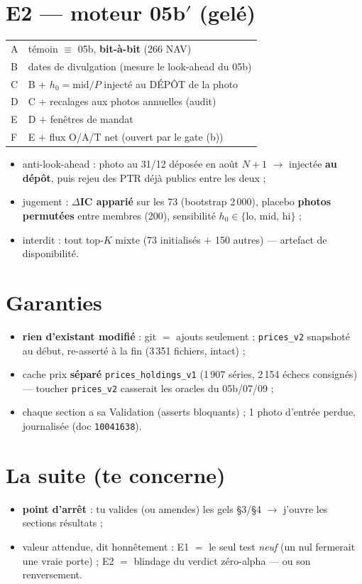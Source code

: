 \documentclass[10pt,a4paper,twocolumn]{article}
\begin{document}
\section{E2 --- moteur 05b$'$ (gelé)}
\begin{center}\small
\begin{tabularx}{\linewidth}{@{}lX@{}}
\toprule
A & témoin $\equiv$ 05b, \textbf{bit-à-bit} (266 NAV) \\
B & dates de divulgation (mesure le look-ahead du 05b) \\
C & B $+$ $h_0 = \text{mid}/P$ injecté au DÉPÔT de la photo \\
D & C $+$ recalages aux photos annuelles (audit) \\
E & D $+$ fenêtres de mandat \\
F & E $+$ flux O/A/T net (ouvert par le gate (b)) \\
\bottomrule
\end{tabularx}
\end{center}
\begin{itemize}
\item anti-look-ahead : photo \og{}au 31/12\fg{} déposée en août $N{+}1$ $\to$ injectée \textbf{au dépôt}, puis rejeu des PTR déjà publics entre les deux ;
\item jugement : \textbf{$\Delta$IC apparié} sur les 73 (bootstrap 2\,000), placebo \textbf{photos permutées} entre membres (200), sensibilité $h_0 \in \{$lo, mid, hi$\}$ ;
\item interdit : tout top-$K$ mixte (73 initialisés $+$ 150 autres) --- artefact de disponibilité.
\end{itemize}

\section{Garanties}
\begin{itemize}
\item \textbf{rien d'existant modifié} : git $=$ ajouts seulement ; \texttt{prices\_v2} snapshoté au début, re-asserté à la fin (3\,351 fichiers, intact) ;
\item cache prix \textbf{séparé} \texttt{prices\_holdings\_v1} (1\,907 séries, 2\,154 échecs consignés) --- toucher \texttt{prices\_v2} casserait les oracles du 05b/07/09 ;
\item chaque section a sa Validation (asserts bloquants) ; 1 photo d'entrée perdue, journalisée (doc \texttt{10041638}).
\end{itemize}

\section{La suite (te concerne)}
\begin{itemize}
\item \textbf{point d'arrêt } : tu valides (ou amendes) les gels \S3/\S4 $\to$ j'ouvre les sections résultats ;
\item valeur attendue, dit honnêtement : E1 $=$ le seul test \emph{neuf} (un nul fermerait une vraie porte) ; E2 $=$ blindage du verdict zéro-alpha --- ou son renversement.
\end{itemize}
\end{document}
